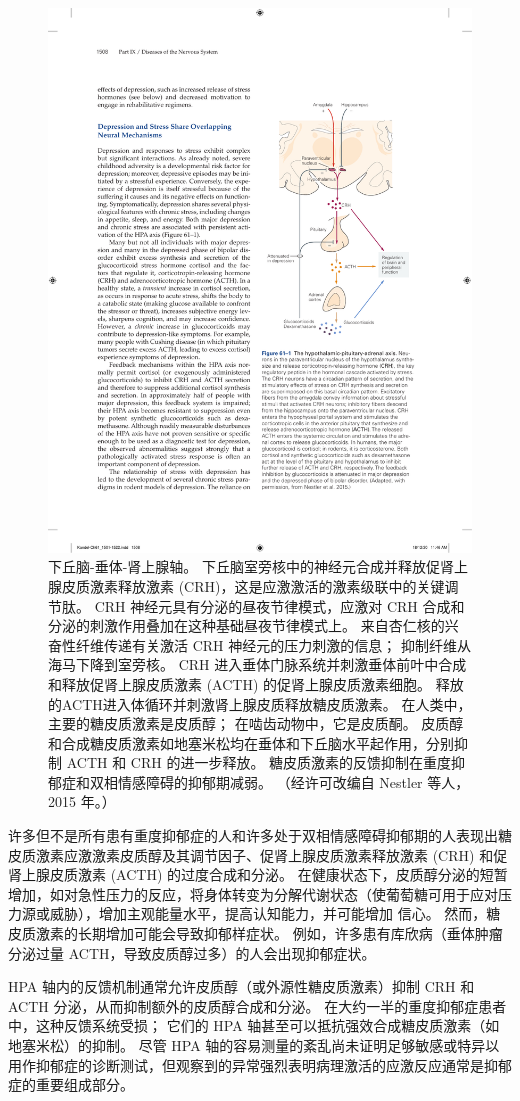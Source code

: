 \begin{figure}[htbp]
	\centering
	\includegraphics[width=0.5\linewidth]{chap61/fig_61_1}
	\caption{下丘脑-垂体-肾上腺轴。 下丘脑室旁核中的神经元合成并释放促肾上腺皮质激素释放激素 (CRH)，这是应激激活的激素级联中的关键调节肽。 CRH 神经元具有分泌的昼夜节律模式，应激对 CRH 合成和分泌的刺激作用叠加在这种基础昼夜节律模式上。 来自杏仁核的兴奋性纤维传递有关激活 CRH 神经元的压力刺激的信息； 抑制纤维从海马下降到室旁核。 CRH 进入垂体门脉系统并刺激垂体前叶中合成和释放促肾上腺皮质激素 (ACTH) 的促肾上腺皮质激素细胞。 释放的ACTH进入体循环并刺激肾上腺皮质释放糖皮质激素。 在人类中，主要的糖皮质激素是皮质醇； 在啮齿动物中，它是皮质酮。 皮质醇和合成糖皮质激素如地塞米松均在垂体和下丘脑水平起作用，分别抑制 ACTH 和 CRH 的进一步释放。 糖皮质激素的反馈抑制在重度抑郁症和双相情感障碍的抑郁期减弱。 （经许可改编自 Nestler 等人，2015 年。）}
	\label{fig:61_1}
\end{figure}


许多但不是所有患有重度抑郁症的人和许多处于双相情感障碍抑郁期的人表现出糖皮质激素应激激素皮质醇及其调节因子、促肾上腺皮质激素释放激素 (CRH) 和促肾上腺皮质激素 (ACTH) 的过度合成和分泌。
在健康状态下，皮质醇分泌的短暂增加，如对急性压力的反应，将身体转变为分解代谢状态（使葡萄糖可用于应对压力源或威胁），增加主观能量水平，提高认知能力，并可能增加 信心。
然而，糖皮质激素的长期增加可能会导致抑郁样症状。
例如，许多患有库欣病（垂体肿瘤分泌过量 ACTH，导致皮质醇过多）的人会出现抑郁症状。


HPA 轴内的反馈机制通常允许皮质醇（或外源性糖皮质激素）抑制 CRH 和 ACTH 分泌，从而抑制额外的皮质醇合成和分泌。
在大约一半的重度抑郁症患者中，这种反馈系统受损；
它们的 HPA 轴甚至可以抵抗强效合成糖皮质激素（如地塞米松）的抑制。
尽管 HPA 轴的容易测量的紊乱尚未证明足够敏感或特异以用作抑郁症的诊断测试，但观察到的异常强烈表明病理激活的应激反应通常是抑郁症的重要组成部分。



